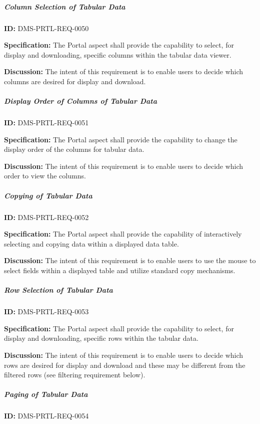 \documentclass[SE,toc,lsstdraft]{lsstdoc}
\begin{document}
\subparagraph{Column Selection of Tabular Data}\hfill  %

\label{DMS-PRTL-REQ-0050}
\textbf{ID:} DMS-PRTL-REQ-0050

\textbf{Specification:}
The Portal aspect shall provide the capability to select, for display and downloading, specific columns within the tabular data viewer.

\textbf{Discussion:}
The intent of this requirement is to enable users to decide which columns are desired for display and download.

\subparagraph{Display Order of Columns of Tabular Data}\hfill  %

\label{DMS-PRTL-REQ-0051}
\textbf{ID:} DMS-PRTL-REQ-0051

\textbf{Specification:}
The Portal aspect shall provide the capability to change the display order of the columns for tabular data.

\textbf{Discussion:}
The intent of this requirement is to enable users to decide which order to view the columns.

\subparagraph{Copying of Tabular Data}\hfill  %

\label{DMS-PRTL-REQ-0052}
\textbf{ID:} DMS-PRTL-REQ-0052

\textbf{Specification:}
The Portal aspect shall provide the capability of interactively selecting and copying data within a displayed data table.

\textbf{Discussion:}
The intent of this requirement is to enable users to use the mouse to select fields within a displayed table and utilize standard copy mechanisms.

\subparagraph{Row Selection of Tabular Data}\hfill  %

\label{DMS-PRTL-REQ-0053}
\textbf{ID:} DMS-PRTL-REQ-0053

\textbf{Specification:}
The Portal aspect shall provide the capability to select, for display and downloading, specific rows within the tabular data.

\textbf{Discussion:}
The intent of this requirement is to enable users to decide which rows are desired for display and download and these may be different from the filtered rows (see filtering requirement below).

\subparagraph{Paging of Tabular Data}\hfill  %

\label{DMS-PRTL-REQ-0054}
\textbf{ID:} DMS-PRTL-REQ-0054
\end{document}
